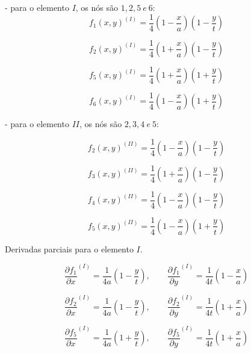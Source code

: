 \documentclass[
12pt,
a4paper,
oneside,
chapter=TITLE,
sumario=tradicional
]{abntex2}
\begin{document}
- para o elemento $I$, os nós são $1,2,5 \: e \: 6$:
\begin{equation*}
	f_1(x,y)^{(I)}=\frac14\left(1-\frac{x}{a}\right)\left(1-\frac{y}{t}\right)  
\end{equation*}

\begin{equation*}
	f_2(x,y)^{(I)}=\frac14\left(1+\frac{x}{a}\right)\left(1-\frac{y}{t}\right)  
\end{equation*}

\begin{equation*}
	f_5(x,y)^{(I)}=\frac14\left(1+\frac{x}{a}\right)\left(1+\frac{y}{t}\right)
\end{equation*}

\begin{equation*}
	f_6(x,y)^{(I)}=\frac14\left(1-\frac{x}{a}\right)\left(1+\frac{y}{t}\right)
\end{equation*}



- para o elemento $II$, os nós são $2,3,4 \: e \: 5$:

\begin{equation*}
	f_2(x,y)^{(II)}=\frac14\left(1-\frac{x}{a}\right)\left(1-\frac{y}{t}\right)  
\end{equation*}

\begin{equation*}
	f_3(x,y)^{(II)}=\frac14\left(1+\frac{x}{a}\right)\left(1-\frac{y}{t}\right)
\end{equation*}

\begin{equation*}
	f_4(x,y)^{(II)}=\frac14\left(1-\frac{x}{a}\right)\left(1-\frac{y}{t}\right)
\end{equation*}

\begin{equation*}
	f_5(x,y)^{(II)}=\frac14\left(1-\frac{x}{a}\right)\left(1+\frac{y}{t}\right)
\end{equation*}

Derivadas parciais para o elemento $I$.

$$  
\frac{\partial f_1}{\partial x}^{(I)}
= \frac{1}{4a}\left(1-\frac{y}{t}\right),  
\qquad  
\frac{\partial f_1}{\partial y}^{(I)}
=\frac{1}{4t}\left(1-\frac{x}{a}\right)  
$$

$$  
\frac{\partial f_2}{\partial x}^{(I)} =
\frac{1}{4a}\left(1-\frac{y}{t}\right),  
\qquad  
\frac{\partial f_2}{\partial y}^{(I)} 
=\frac{1}{4t}\left(1+\frac{x}{a}\right)  
$$

$$  
\frac{\partial f_5}{\partial x}^{(I)}=
\frac{1}{4a}\left(1+\frac{y}{t}\right),  
\qquad  
\frac{\partial f_5}{\partial y}^{(I)}=
\frac{1}{4t}\left(1+\frac{x}{a}\right)  
$$
\end{document}
